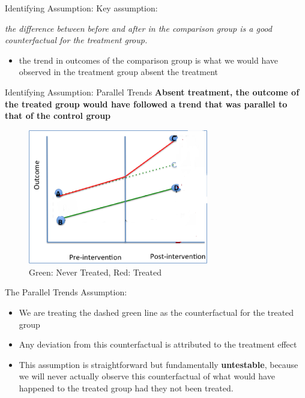 \documentclass[
  ignorenonframetext,
]{beamer}
\providecommand{\tightlist}{%
  \setlength{\itemsep}{0pt}\setlength{\parskip}{0pt}}
\begin{document}
\begin{frame}{Identifying Assumption:}
\protect\hypertarget{identifying-assumption}{}
Key assumption:

\textit{the difference between before and after in the comparison group is a good counterfactual for the treatment group.}

\begin{itemize}
\tightlist
\item
  the trend in outcomes of the comparison group is what we would have
  observed in the treatment group absent the treatment
\end{itemize}
\end{frame}

\begin{frame}{Identifying Assumption: Parallel Trends}
\protect\hypertarget{identifying-assumption-parallel-trends}{}
\textbf{Absent treatment, the outcome of the treated group would have
followed a trend that was parallel to that of the control group}

\begin{figure}
\centering
\includegraphics[width=0.7\textwidth,height=\textheight]{"images/DIDregressionblank.png"}
\caption{Green: Never Treated, Red: Treated}
\end{figure}
\end{frame}

\begin{frame}{The Parallel Trends Assumption:}
\protect\hypertarget{the-parallel-trends-assumption}{}
\begin{itemize}
\item
  We are treating the dashed green line as the counterfactual for the
  treated group
\item
  Any deviation from this counterfactual is attributed to the treatment
  effect
\item
  This assumption is straightforward but fundamentally
  \textbf{untestable}, because we will never actually observe this
  counterfactual of what would have happened to the treated group had
  they not been treated.
\end{itemize}
\end{frame}
\end{document}
